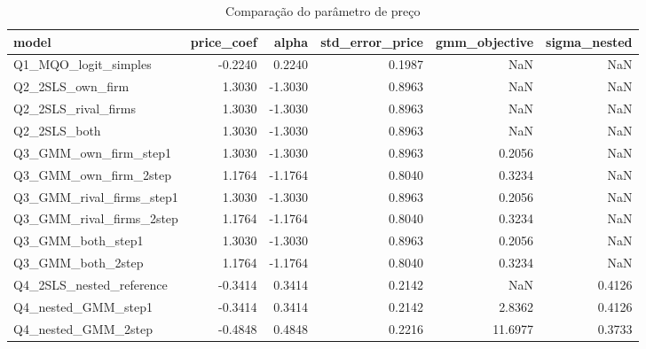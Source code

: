 \begin{table}[!htbp]
\centering
\caption{Comparação do parâmetro de preço}
\label{tab:price-compare}
\small
\begin{tabular}{lrrrrr}
\toprule
model & price_coef & alpha & std_error_price & gmm_objective & sigma_nested \\
\midrule
Q1_MQO_logit_simples & -0.2240 & 0.2240 & 0.1987 & NaN & NaN \\
Q2_2SLS_own_firm & 1.3030 & -1.3030 & 0.8963 & NaN & NaN \\
Q2_2SLS_rival_firms & 1.3030 & -1.3030 & 0.8963 & NaN & NaN \\
Q2_2SLS_both & 1.3030 & -1.3030 & 0.8963 & NaN & NaN \\
Q3_GMM_own_firm_step1 & 1.3030 & -1.3030 & 0.8963 & 0.2056 & NaN \\
Q3_GMM_own_firm_2step & 1.1764 & -1.1764 & 0.8040 & 0.3234 & NaN \\
Q3_GMM_rival_firms_step1 & 1.3030 & -1.3030 & 0.8963 & 0.2056 & NaN \\
Q3_GMM_rival_firms_2step & 1.1764 & -1.1764 & 0.8040 & 0.3234 & NaN \\
Q3_GMM_both_step1 & 1.3030 & -1.3030 & 0.8963 & 0.2056 & NaN \\
Q3_GMM_both_2step & 1.1764 & -1.1764 & 0.8040 & 0.3234 & NaN \\
Q4_2SLS_nested_reference & -0.3414 & 0.3414 & 0.2142 & NaN & 0.4126 \\
Q4_nested_GMM_step1 & -0.3414 & 0.3414 & 0.2142 & 2.8362 & 0.4126 \\
Q4_nested_GMM_2step & -0.4848 & 0.4848 & 0.2216 & 11.6977 & 0.3733 \\
\bottomrule
\end{tabular}

\end{table}

